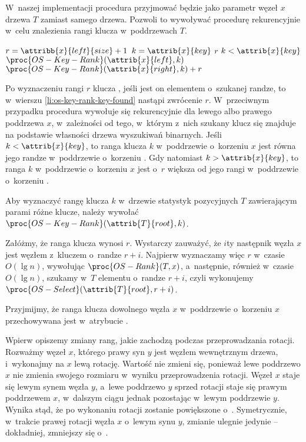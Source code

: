 \exercise %
W~naszej implementacji procedura przyjmować będzie jako parametr węzeł $x$ drzewa $T$ zamiast samego drzewa.
Pozwoli to wywoływać procedurę rekurencyjnie w~celu znalezienia rangi klucza w~poddrzewach $T$.
\begin{codebox}
\li	$r=\attribb{x}{left}{size}+1$
\li	\If $k=\attrib{x}{key}$
\li		\Then \Return $r$ \label{li:os-key-rank-key-found}
		\End
\li	\If $k<\attrib{x}{key}$
\li		\Then \Return $\proc{OS-Key-Rank}(\attrib{x}{left},k)$
\li		\Else \Return $\proc{OS-Key-Rank}(\attrib{x}{right},k)+r$
		\End
\end{codebox}
Po wyznaczeniu rangi $r$ klucza , jeśli jest on elementem o~szukanej randze, to w~wierszu \ref{li:os-key-rank-key-found} nastąpi zwrócenie $r$.
W~przeciwnym przypadku procedura wywołuje się rekurencyjnie dla lewego albo prawego poddrzewa $x$, w~zależności od tego, w~którym z~nich szukany klucz się znajduje na podstawie własności drzewa wyszukiwań binarnych.
Jeśli $k<\attrib{x}{key}$, to ranga klucza $k$ w~poddrzewie o~korzeniu $x$ jest równa jego randze w~poddrzewie o~korzeniu .
Gdy natomiast $k>\attrib{x}{key}$, to ranga $k$ w~poddrzewie o~korzeniu $x$ jest o~$r$ większa od jego rangi w~poddrzewie o~korzeniu .

Aby wyznaczyć rangę klucza $k$ w~drzewie statystyk pozycyjnych $T$ zawierającym parami różne klucze, należy wywołać $\proc{OS-Key-Rank}(\attrib{T}{root},k)$.

\exercise %
Załóżmy, że ranga klucza  wynosi $r$.
Wystarczy zauważyć, że $i$\nbhyphen ty następnik węzła $x$ jest węzłem z~kluczem o~randze $r+i$.
Najpierw wyznaczamy więc $r$ w~czasie $O(\lg n)$, wywołując $\proc{OS-Rank}(T,x)$, a~następnie, również w~czasie $O(\lg n)$, szukamy w~$T$ elementu o~randze $r+i$, czyli wykonujemy $\proc{OS-Select}(\attrib{T}{root},r+i)$.

\exercise %
Przyjmijmy, że ranga klucza dowolnego węzła $x$ w~poddrzewie o~korzeniu $x$ przechowywana jest w~atrybucie .

Wpierw opiszemy zmiany rang, jakie zachodzą podczas przeprowadzania rotacji.
Rozważmy węzeł $x$, którego prawy syn $y$ jest węzłem wewnętrznym drzewa, i~wykonajmy na $x$ lewą rotację.
Wartość  nie zmieni się, ponieważ lewe poddrzewo $x$ nie zmienia swojego rozmiaru w~wyniku przeprowadzenia rotacji.
Węzeł $x$ staje się lewym synem węzła $y$, a~lewe poddrzewo $y$ sprzed rotacji staje się prawym poddrzewem $x$, w~dalszym ciągu jednak pozostając w~lewym poddrzewie $y$.
Wynika stąd, że po wykonaniu rotacji  zostanie powiększone o~.
Symetrycznie, w~trakcie prawej rotacji węzła $x$ o~lewym synu $y$, zmianie ulegnie jedynie  -- dokładniej, zmniejszy się o~.

